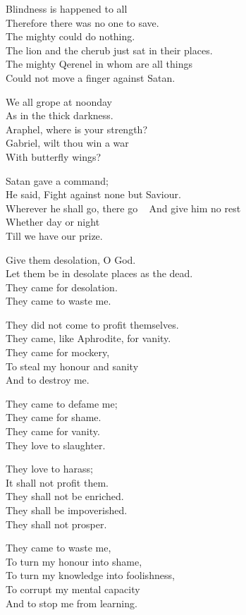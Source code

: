\documentclass[
]{book}
\begin{document}
Blindness is happened to all\\
Therefore there was no one to save.\\
The mighty could do nothing.\\
The lion and the cherub just sat in their places.\\
The mighty Qerenel in whom are all things\\
Could not move a finger against Satan.

We all grope at noonday\\
As in the thick darkness.\\
Araphel, where is your strength?\\
Gabriel, wilt thou win a war\\
With butterfly wings?

Satan gave a command;\\
He said, Fight against none but Saviour.\\
Wherever he shall go, there go ~
And give him no rest\\
Whether day or night\\
Till we have our prize.

Give them desolation, O God.\\
Let them be in desolate places as the dead.\\
They came for desolation.\\
They came to waste me.

They did not come to profit themselves.\\
They came, like Aphrodite, for vanity.\\
They came for mockery,\\
To steal my honour and sanity\\
And to destroy me.

They came to defame me;\\
They came for shame.\\
They came for vanity.\\
They love to slaughter.

They love to harass;\\
It shall not profit them.\\
They shall not be enriched.\\
They shall be impoverished.\\
They shall not prosper.

They came to waste me,\\
To turn my honour into shame,\\
To turn my knowledge into foolishness,\\
To corrupt my mental capacity\\
And to stop me from learning.
\end{document}

